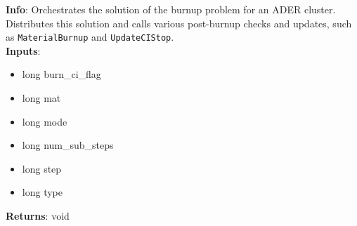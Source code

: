 \textbf{Info}: Orchestrates the solution of the burnup problem for an ADER
cluster. Distributes this solution and calls various post-burnup checks and
updates, such as \texttt{MaterialBurnup} and \texttt{UpdateCIStop}.\\

\noindent \textbf{Inputs}:
\begin{itemize}
\item{long burn\_ci\_flag}
\item{long mat}
\item{long mode}
\item{long num\_sub\_steps}
\item{long step}
\item{long type}
\end{itemize}

\noindent \textbf{Returns}: void
